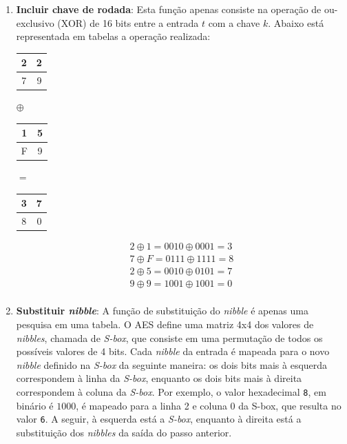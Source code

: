 \documentclass{article}
\begin{document}
\begin{enumerate}
    \item \textbf{Incluir chave de rodada}: Esta função apenas consiste na
    operação de ou-exclusivo (XOR) de 16 bits entre a entrada $t$ com a chave
    $k$. Abaixo está representada em tabelas a operação realizada:
    \begin{center}
        \begin{tabular}{|c|c|}
            \hline
            2 & 2  \\
            \hline
            7 & 9 \\
            \hline
        \end{tabular}
        $\oplus$
        \begin{tabular}{|c|c|}
            \hline
            1 & 5  \\
            \hline
            F & 9 \\
            \hline
        \end{tabular}
        $=$
        \begin{tabular}{|c|c|}
            \hline
            3 & 7  \\
            \hline
            8 & 0 \\
            \hline
        \end{tabular}
    \end{center}
    \begin{gather*}
        2 \oplus 1 = 0010 \oplus 0001 = 3 \\
        7 \oplus F = 0111 \oplus 1111 = 8 \\
        2 \oplus 5 = 0010 \oplus 0101 = 7 \\
        9 \oplus 9 = 1001 \oplus 1001 = 0 \\
    \end{gather*}
    
    \item \textbf{Substituir \textit{nibble}}: A função de substituição do
    \textit{nibble} é apenas uma pesquisa em uma tabela. O AES define uma
    matriz 4x4 dos valores de \textit{nibbles}, chamada de \textit{S-box}, que
    consiste em uma permutação de todos os possíveis valores de 4 bits. Cada
    \textit{nibble} da entrada é mapeada para o novo \textit{nibble} definido
    na \textit{S-box} da seguinte maneira: os dois bits mais à esquerda
    correspondem à linha da \textit{S-box}, enquanto os dois bits mais à
    direita correspondem à coluna da \textit{S-box}. Por exemplo, o valor
    hexadecimal \texttt{8}, em binário é $1000$, é mapeado para a linha 2 e
    coluna 0 da S-box, que resulta no valor \texttt{6}. A seguir, à esquerda
    está a \textit{S-box}, enquanto à direita está a substituição dos
    \textit{nibbles} da saída do passo anterior.


\end{enumerate}
\end{document}
